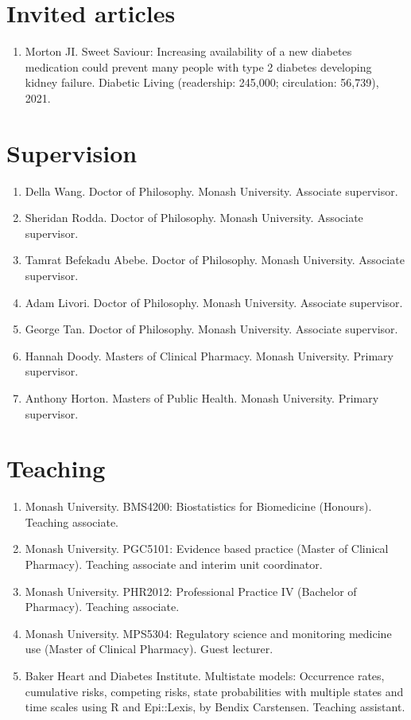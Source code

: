 \documentclass[11pt]{article}
\begin{document}
\section*{Invited articles}
\begin{enumerate}
\item Morton JI. Sweet Saviour: Increasing availability of a new diabetes medication could prevent many people with 
type 2 diabetes developing kidney failure. Diabetic Living (readership: 245,000; circulation: 56,739), 2021. 
\end{enumerate}


\section*{Supervision}
\begin{enumerate}
\item Della Wang. Doctor of Philosophy. Monash University. Associate supervisor. 
\item Sheridan Rodda. Doctor of Philosophy. Monash University. Associate supervisor. 
\item Tamrat Befekadu Abebe. Doctor of Philosophy. Monash University. Associate supervisor. 
\item Adam Livori. Doctor of Philosophy. Monash University. Associate supervisor. 
\item George Tan. Doctor of Philosophy. Monash University. Associate supervisor. 
\item Hannah Doody. Masters of Clinical Pharmacy. Monash University. Primary supervisor. 
\item Anthony Horton. Masters of Public Health. Monash University. Primary supervisor.
\end{enumerate}

\section*{Teaching}
\begin{enumerate}
\item Monash University. BMS4200: Biostatistics for Biomedicine (Honours). Teaching associate.
\item Monash University. PGC5101: Evidence based practice (Master of Clinical Pharmacy). Teaching associate and interim unit coordinator.
\item Monash University. PHR2012: Professional Practice IV (Bachelor of Pharmacy). Teaching associate.
\item Monash University. MPS5304: Regulatory science and monitoring medicine use (Master of Clinical Pharmacy). Guest lecturer.
\item Baker Heart and Diabetes Institute. Multistate models: Occurrence rates, cumulative risks, 
competing risks, state probabilities with multiple states and time scales using R and Epi::Lexis, by Bendix Carstensen. Teaching assistant.
\end{enumerate}
\end{document}
